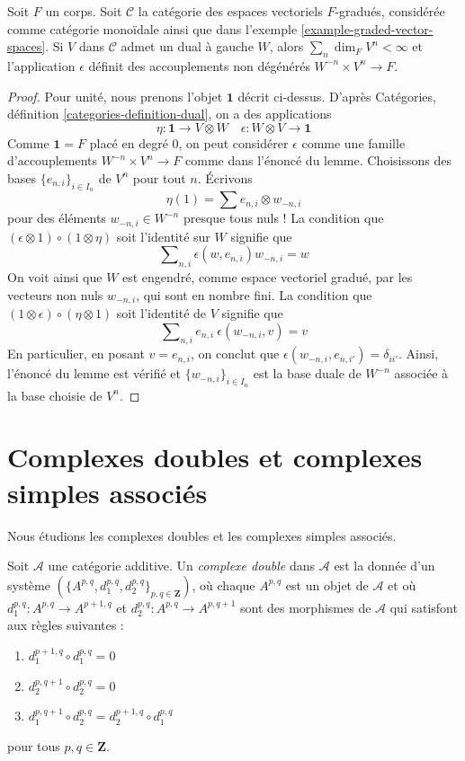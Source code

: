 \begin{lemma}
\label{lemma-left-dual-graded-vector-spaces}
Soit $F$ un corps. Soit $\mathcal{C}$ la catégorie des espaces vectoriels
$F$-gradués, considérée comme catégorie monoïdale ainsi que dans
l'exemple \ref{example-graded-vector-spaces}. Si $V$ dans $\mathcal{C}$
admet un dual à gauche $W$, alors $\sum_n \dim_F V^n < \infty$
et l'application $\epsilon$ définit des accouplements non dégénérés
$W^{-n} \times V^n \to F$.
\end{lemma}

\begin{proof}
Pour unité, nous prenons l'objet $\mathbf{1}$ décrit ci-dessus.
D'après Catégories, définition \ref{categories-definition-dual}, on a des
applications
$$
\eta : \mathbf{1} \to V \otimes W\quad
\epsilon : W \otimes V \to \mathbf{1}
$$
Comme $\mathbf{1} = F$ placé en degré $0$, on peut
considérer $\epsilon$ comme une famille d'accouplements
$W^{-n} \times V^n \to F$ comme dans l'énoncé du lemme.
Choisissons des bases $\{e_{n, i}\}_{i \in I_n}$ de $V^n$ pour tout $n$.
Écrivons
$$
\eta(1) = \sum e_{n, i} \otimes w_{-n, i}
$$
pour des éléments $w_{-n, i} \in W^{-n}$ presque tous nuls !
La condition que $(\epsilon \otimes 1) \circ (1 \otimes \eta)$ soit
l'identité sur $W$ signifie que
$$
\sum\nolimits_{n, i} \epsilon(w, e_{n, i})w_{-n, i} = w
$$
On voit ainsi que $W$ est engendré, comme espace vectoriel gradué,
par les vecteurs non nuls $w_{-n, i}$, qui sont en nombre fini.
La condition que $(1 \otimes \epsilon) \circ (\eta \otimes 1)$
soit l'identité de $V$ signifie que
$$
\sum\nolimits_{n, i} e_{n, i}\ \epsilon(w_{-n, i}, v) = v
$$
En particulier, en posant $v = e_{n, i}$, on conclut que
$\epsilon(w_{-n, i}, e_{n, i'}) = \delta_{ii'}$. Ainsi,
l'énoncé du lemme est vérifié et
$\{w_{-n, i}\}_{i \in I_n}$ est la base duale de $W^{-n}$ associée à
la base choisie de $V^n$.
\end{proof}
\section{Complexes doubles et complexes simples associés}
\label{section-double-complexes}

\noindent
Nous étudions les complexes doubles et les complexes simples associés.

\begin{definition}
\label{definition-double-complex}
Soit $\mathcal{A}$ une catégorie additive.
Un {\it complexe double} dans $\mathcal{A}$ est la donnée
d'un système $(\{A^{p, q}, d_1^{p, q}, d_2^{p, q}\}_{p, q\in \mathbf{Z}})$,
où chaque $A^{p, q}$ est un objet de $\mathcal{A}$ et où
$d_1^{p, q} : A^{p, q} \to A^{p + 1, q}$ et
$d_2^{p, q} : A^{p, q} \to A^{p, q + 1}$ sont des morphismes de $\mathcal{A}$
qui satisfont aux règles suivantes :
\begin{enumerate}
\item $d_1^{p + 1, q} \circ d_1^{p, q} = 0$
\item $d_2^{p, q + 1} \circ d_2^{p, q} = 0$
\item $d_1^{p, q + 1} \circ d_2^{p, q} = d_2^{p + 1, q} \circ d_1^{p, q}$
\end{enumerate}
pour tous $p, q \in \mathbf{Z}$.
\end{definition}

